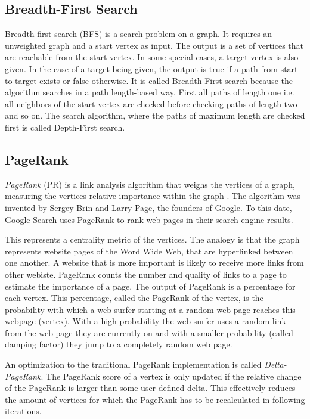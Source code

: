 \subsection{Breadth-First Search}
Breadth-first search (BFS) is a search problem on a graph.
It requires an unweighted graph and a start vertex as input.
The output is a set of vertices that are reachable from the start vertex.
In some special cases, a target vertex is also given. In the case of a target being given, the output is true if a path from start to target exists or false otherwise.
It is called Breadth-First search because the algorithm searches in a path length-based way. First all paths of length one i.e. all neighbors of the start vertex are checked before checking paths of length two and so on.
The search algorithm, where the paths of maximum length are checked first is called Depth-First search.

\subsection{PageRank}
\emph{PageRank} (PR) is a link analysis algorithm that weighs the vertices of a graph, measuring the vertices relative importance within the graph \cite{pagerank}.
The algorithm was invented by Sergey Brin and Larry Page, the founders of Google. To this date, Google Search uses PageRank to rank web pages in their search engine results.



This represents a centrality metric of the vertices.
The analogy is that the graph represents website pages of the Word Wide Web, that are hyperlinked between one another. A website that is more important is likely to receive more links from other webiste.
PageRank counts the number and quality of links to a page to estimate the importance of a page.
The output of PageRank is a percentage for each vertex. This percentage, called the PageRank of the vertex, is the probability with which a web surfer starting at a random web page reaches this webpage (vertex).
With a high probability the web surfer uses a random link from the web page they are currently on and with a smaller probability (called damping factor) they jump to a completely random web page.



An optimization to the traditional PageRank implementation is called \emph{Delta-PageRank}.
The PageRank score of a vertex is only updated if the relative change of the PageRank is larger than some user-defined delta.
This effectively reduces the amount of vertices for which the PageRank has to be recalculated in following iterations.

